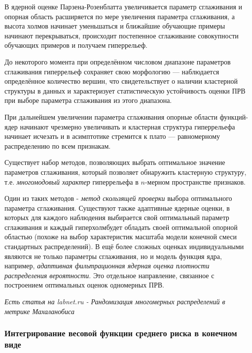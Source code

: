 \documentclass[a4paper]{article}
\numberwithin{equation}{subsection}
\begin{document}
В ядерной оценке Парзена-Розенблатта увеличивается параметр сглаживания и опорная область
расширяется по мере увеличения параметра сглаживания, а высота \glqq холмов\grqq
начинает уменьшаться и ближайшие обучающие примеры начинают перекрываться, происходит
постепенное сглаживание совокупности обучающих примеров и получаем \glqq гиперрельеф\grqq.

До некоторого момента при определённом числовом диапазоне параметров 
сглаживания гиперрельеф сохраняет свою морфологию --- наблюдается определённое количество
вершин, что свидетельствует о наличии кластерной структуры в данных и характеризует
статистическую устойчивость оценки ПРВ при выборе параметра сглаживания из этого диапазона.

При дальнейшем увеличении параметра сглаживания опорные области функций-ядер начинают
чрезмерно увеличивать и кластерная структура гиперрельефа начинает
исчезать и в асимптотике стремится к плато --- равномерному распределению 
по всем признакам.

Существует набор методов, позволяющих выбрать оптимальное значение параметров сглаживания,
который позволяет обнаружить кластерную структуру, т.е. \textit{многомодовый характер} 
гиперрельефа в $n$-мерном пространстве признаков.

Один из таких методов - \textit{метод скользящей проверки} выбора оптимального параметра
сглаживания. Существуют также адаптивные ядерные оценки, в которых для каждого наблюдения
выбирается свой оптимальный параметр сглаживания и каждый \glqq гиперхолм\grqq будет
обладать своей оптимальной опорной областью (похоже на выбор характеристик масштаба 
модели конечной смеси стандартных распределений).
В ещё более сложных оценках индивидуальными являются не только параметры сглаживания,
но и модель функция ядра, например, \textit{адаптивная фильтрационная ядерная оценка
плотности распределения вероятности}. Это отдельное направление, связанное с 
построением оптимальных оценок одномерных ПРВ.

\begin{myquote}
    \textit{Есть статья на labnet.ru - Рандомизация многомерных распределений в метрике
    Махаланобиса}
\end{myquote}




\subsubsection{Интегрирование весовой функции среднего риска в конечном виде}
\end{document}
